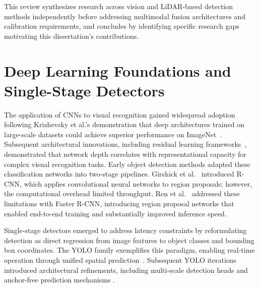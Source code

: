 \documentclass{erauthesis}
\begin{document}
This review synthesizes research across vision and \ac{LiDAR}-based detection methods independently before addressing multimodal fusion architectures and calibration requirements, and concludes by identifying specific research gaps motivating this dissertation's contributions.


\section{Deep Learning Foundations and Single-Stage Detectors}

The application of \acp{CNN} to visual recognition gained widespread adoption following Krizhevsky et al.'s demonstration that deep architectures trained on large-scale datasets could achieve superior performance on ImageNet~\cite{krizhevsky2017}.
Subsequent architectural innovations, including residual learning frameworks~\cite{he2016}, demonstrated that network depth correlates with representational capacity for complex visual recognition tasks.
Early object detection methods adapted these classification networks into two-stage pipelines.
Girshick et al.~\cite{girshick2014} introduced \ac{R-CNN}, which applies convolutional neural networks to region proposals; however, the computational overhead limited throughput.
Ren et al.~\cite{ren2016} addressed these limitations with Faster \ac{R-CNN}, introducing region proposal networks that enabled end-to-end training and substantially improved inference speed.

Single-stage detectors emerged to address latency constraints by reformulating detection as direct regression from image features to object classes and bounding box coordinates.
The \ac{YOLO} family exemplifies this paradigm, enabling real-time operation through unified spatial prediction~\cite{redmon2016}.
Subsequent \ac{YOLO} iterations introduced architectural refinements, including multi-scale detection heads and anchor-free prediction mechanisms \cite{terven2023}.
\end{document}
